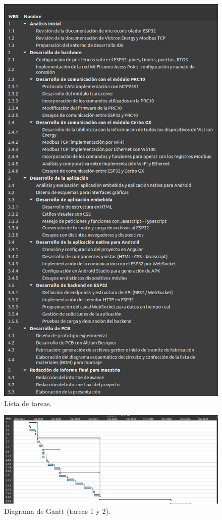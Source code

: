 \documentclass[
11pt, %
]{charter}
\begin{document}
\begin{figure}[H]
\centering
\includegraphics[scale=0.34]{./Figuras/tareas2.png}
\caption{Lista de tareas.}
\label{fig:wbs}
\end{figure}

\begin{landscape}
\begin{figure}
\centering 
\includegraphics[scale=0.7]{./Figuras/gantt_1.png}
\caption{Diagrama de Gantt (tareas 1 y 2).}
\label{fig:gantt1}
\end{figure}

\end{landscape}
\end{document}
